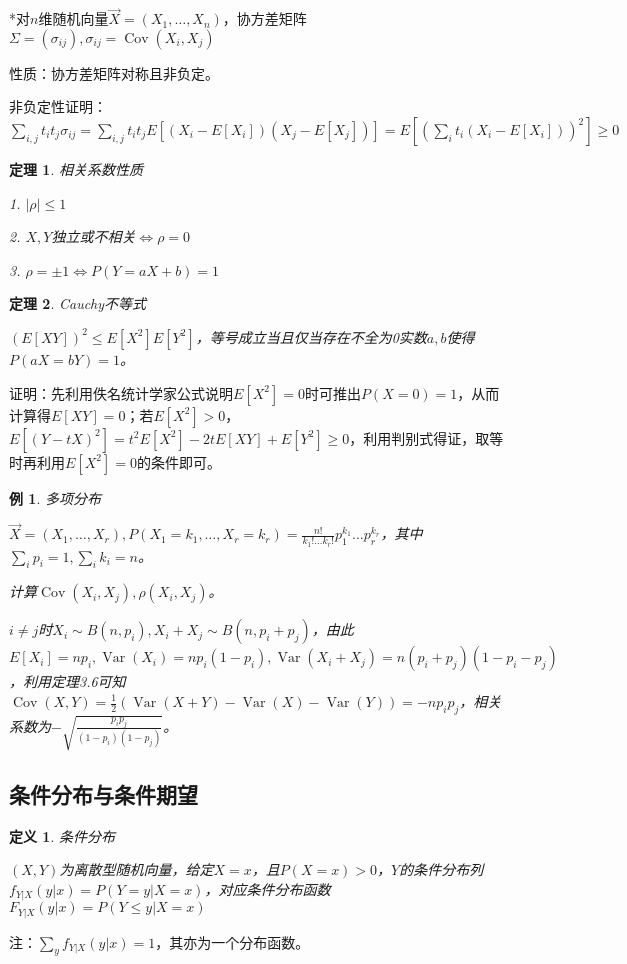 \documentclass[a4paper,UTF8,fontset=windows]{ctexart}
\newtheorem{thm}{定理}[section]
\newtheorem{exmp}{例}[section]
\newtheorem{defi}{定义}[section]
\DeclareMathOperator{\Cov}{Cov}
\DeclareMathOperator{\Var}{Var}
\begin{document}
*对$n$维随机向量$\vec{X}=(X_1,\dots,X_n)$，协方差矩阵$\Sigma=(\sigma_{ij}),\sigma_{ij}=\Cov(X_i,X_j)$

性质：协方差矩阵对称且非负定。

非负定性证明：$\sum_{i,j}t_it_j\sigma_{ij}=\sum_{i,j}t_it_jE[(X_i-E[X_i])(X_j-E[X_j])]=E\left[\left(\sum_it_i(X_i-E[X_i])\right)^2\right]\ge0$

\begin{thm} 相关系数性质

1. $|\rho|\le1$

2. $X,Y$独立或不相关$\Leftrightarrow\rho=0$

3. $\rho=\pm1\Leftrightarrow P(Y=aX+b)=1$
\end{thm}

\begin{thm} Cauchy不等式

$(E[XY])^2\le E[X^2]E[Y^2]$，等号成立当且仅当存在不全为0实数$a,b$使得$P(aX=bY)=1$。
\end{thm}

证明：先利用佚名统计学家公式说明$E[X^2]=0$时可推出$P(X=0)=1$，从而计算得$E[XY]=0$；若$E[X^2]>0$，$E[(Y-tX)^2]=t^2E[X^2]-2tE[XY]+E[Y^2]\ge0$，利用判别式得证，取等时再利用$E[X^2]=0$的条件即可。

\begin{exmp} 多项分布

$\vec{X}=(X_1,\dots,X_r),P(X_1=k_1,\dots,X_r=k_r)=\frac{n!}{k_1!\dots k_r!}p_1^{k_1}\dots p_r^{k_r}$，其中$\sum_ip_i=1,\sum_ik_i=n$。

计算$\Cov(X_i,X_j),\rho(X_i,X_j)$。

$i\neq j$时$X_i\sim B(n,p_i),X_i+X_j\sim B(n,p_i+p_j)$，由此$E[X_i]=np_i,\Var(X_i)=np_i(1-p_i),\Var(X_i+X_j)=n(p_i+p_j)(1-p_i-p_j)$，利用定理3.6可知$\Cov(X,Y)=\frac{1}{2}(\Var(X+Y)-\Var(X)-\Var(Y))=-np_ip_j$，相关系数为$-\sqrt{\frac{p_ip_j}{(1-p_i)(1-p_j)}}$。
\end{exmp}

\subsection{条件分布与条件期望}
\begin{defi} 条件分布

$(X,Y)$为离散型随机向量，给定$X=x$，且$P(X=x)>0$，$Y$的条件分布列$f_{Y|X}(y|x)=P(Y=y|X=x)$，对应条件分布函数$F_{Y|X}(y|x)=P(Y\le y|X=x)$
\end{defi}

注：$\sum_yf_{Y|X}(y|x)=1$，其亦为一个分布函数。
\end{document}
